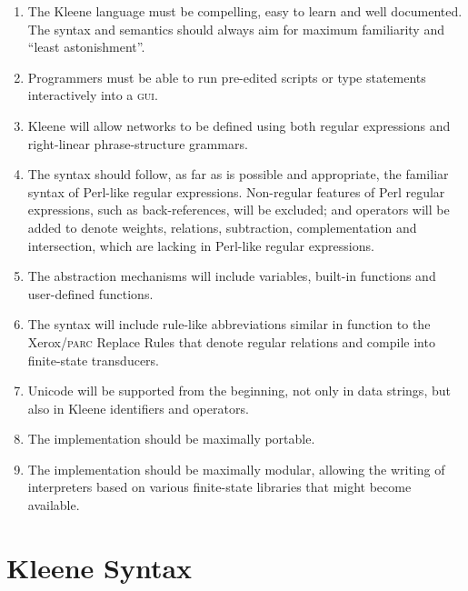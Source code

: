 \documentclass[letterpaper,12pt]{article}
\newcommand{\Kleene}{Kleene\xspace}
\newcommand{\acro}{\textsc}
\begin{document}
\begin{enumerate}

\item
The \Kleene{} language must be compelling, easy to learn and well documented.  
The syntax and semantics should always aim for maximum
familiarity and ``least astonishment''.

\item
Programmers must be able to run pre-edited scripts or
type statements interactively into a \acro{gui}.

\item
\Kleene{} will allow networks to be defined using 
both regular expressions and right-linear
phrase-structure grammars. 

\item
The syntax should follow, as far as is
possible and appropriate, the familiar syntax of Perl-like regular
expressions.  Non-regular features of Perl regular expressions, 
such as back-references, will be
excluded; and operators will be added to denote weights,
relations, subtraction, complementation and intersection, which are
lacking in Perl-like regular expressions.

\item
The abstraction mechanisms will include variables, built-in functions
and user-defined functions.


\item
The syntax will include rule-like abbreviations similar in function to the
Xerox/\acro{parc} Replace Rules
\cite{karttunen:1995,karttunen+kempe:1995,karttunen:1996,kempe+karttunen:1996,mohri+sproat:1996} that denote regular relations and
compile into finite-state transducers.  

\item
Unicode will be supported from the beginning, not only in data
strings, but also in \Kleene{} identifiers and operators.

\item
The implementation should be maximally portable.

\item
The implementation should be maximally modular, allowing the writing of
interpreters based on various finite-state libraries that might become
available.

\end{enumerate}

\section{Kleene Syntax}
\end{document}
